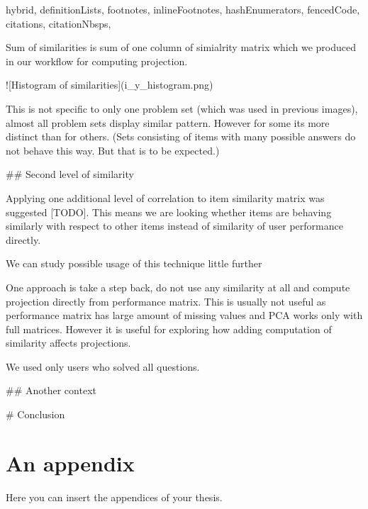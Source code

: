 \documentclass[
  digital, %
  table,   %
  nolof,     %
  nolot,     %
  nocover
]{fithesis3}
\begin{document}
\begin{markdown*}{%
  hybrid,
  definitionLists,
  footnotes,
  inlineFootnotes,
  hashEnumerators,
  fencedCode,
  citations,
  citationNbsps,
}

 Sum of similarities is sum of one column of simialrity matrix which we produced in our workflow for computing projection.

![Histogram of similarities](i_y_histogram.png)



This is not specific to only one problem set (which was used in previous images), almost all problem sets display similar pattern. However for some its more distinct than for others. (Sets consisting of items with many possible answers do not behave this way. But that is to be expected.)







## Second level of similarity

Applying one additional level of correlation to item similarity matrix was suggested [TODO].
This means we are looking whether items are behaving similarly with respect to other items instead of similarity of user performance directly.

We can study possible usage of this technique little further

One approach is take a step back, do not use any similarity at all and compute projection directly from performance matrix.
This is usually not useful as performance matrix has large amount of missing values and PCA works only with full matrices.
However it is useful for exploring how adding computation of similarity affects projections.

We used only users who solved all questions.

## Another context



# Conclusion




\end{markdown*}

  \makeatletter\thesis@blocks@clear\makeatother
  \printindex

\appendix %
\chapter{An appendix}
Here you can insert the appendices of your thesis.
\end{document}

